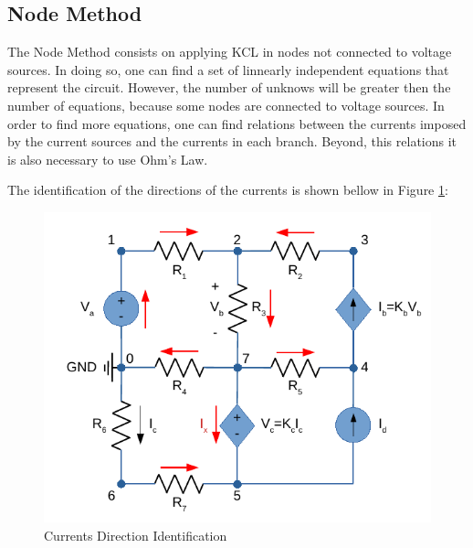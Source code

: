 \subsection{Node Method}
\label{subsec:Node Method}\par
The Node Method consists on applying KCL in nodes not connected to voltage sources. In doing so, one can find a set of linnearly independent equations that represent the circuit. However, the number of unknows will be greater then the number of equations, because some nodes are connected to voltage sources. In order to find more equations, one can find relations between the currents imposed by the current sources and the currents in each branch. Beyond, this relations it is also necessary to use Ohm's Law.\par
The identification of the directions of the currents is shown bellow in Figure \ref{fig:NodeMethod}:


\begin{figure}[h] \centering
  \includegraphics[width=0.7\linewidth]{NodeMethod.pdf}
  \caption{Currents Direction Identification}
  \label{fig:NodeMethod}
\end{figure}

